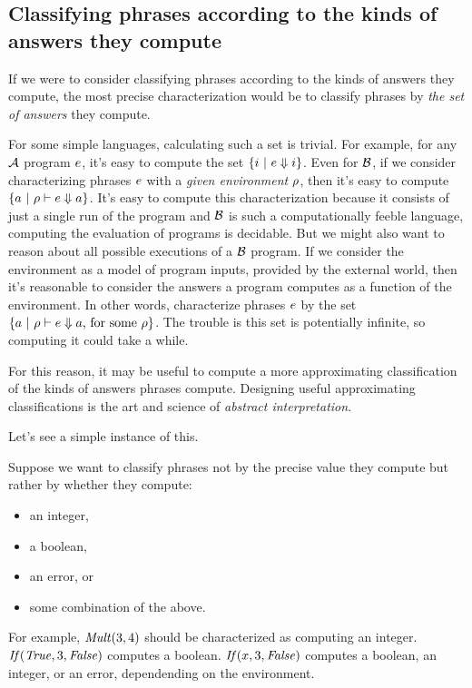 \subsection{Classifying phrases according to the kinds of answers they compute}

If we were to consider classifying phrases according to the kinds of
answers they compute, the most precise characterization would be to
classify phrases by \emph{the set of answers} they compute.

For some simple languages, calculating such a set is trivial.  For
example, for any $\mathcal{A}$ program $e$, it's easy to compute the
set $\{i\ |\ e \Downarrow i \}$.  
%
Even for $\mathcal{B}$, if we consider characterizing phrases $e$ with
a \emph{given environment} $\rho$, then it's easy to compute $\{
a\ |\ \rho \vdash e \Downarrow a \}$.  It's easy to
compute this characterization because it consists of just a single run
of the program and $\mathcal{B}$ is such a computationally feeble
language, computing the evaluation of programs is decidable.
%
But we might also want to reason about all possible executions of a
$\mathcal{B}$ program.  If we consider the environment as a model of
program inputs, provided by the external world, then it's reasonable
to consider the answers a program computes as a function of the
environment.  In other words, characterize phrases $e$ by the set
$\{ a\ |\ \rho \vdash e \Downarrow a\text{, for some
}\rho\}$.  The trouble is this set is potentially infinite, so
computing it could take a while.

For this reason, it may be useful to compute a more approximating
classification of the kinds of answers phrases compute.  Designing
useful approximating classifications is the art and science of
\emph{abstract interpretation}.

Let's see a simple instance of this.

Suppose we want to classify phrases not by the precise value they
compute but rather by whether they compute:
\begin{itemize}
\item an integer,
\item a boolean,
\item an error, or
\item some combination of the above.
\end{itemize}

For example, $\mathit{Mult}(3, 4)$ should be characterized as computing an
integer.  $\mathit{If}(\mathit{True},3,\mathit{False})$ computes a boolean.
$\mathit{If}(x,3,\mathit{False})$ computes a boolean, an integer, or an error,
dependending on the environment.


